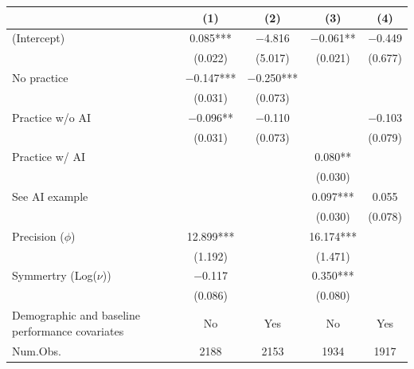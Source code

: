 \documentclass[11pt]{report}
\begin{document}
\begin{append}
\begin{table}[ht]
    \begin{tabular}{lcccc}
    \toprule
& (1) & (2) & (3) & (4) \\ \midrule 
(Intercept)                                                                      & \num{0.085}***  & \num{-4.816}    & \num{-0.061}**  & \num{-0.449}   \\
& (\num{0.022})   & (\num{5.017})   & (\num{0.021})   & (\num{0.677})  \\
No practice                                                             & \num{-0.147}*** & \num{-0.250}*** &                  &                 \\
& (\num{0.031})   & (\num{0.073})   &                  &                 \\
Practice w/o AI                                                          & \num{-0.096}**  & \num{-0.110}    &                  & \num{-0.103}   \\
& (\num{0.031})   & (\num{0.073})   &                  & (\num{0.079})  \\
Practice w/ AI                                                           &                  &                  & \num{0.080}**   &                 \\
&                  &                  & (\num{0.030})   &                 \\
See AI example                                                          &                  &                  & \num{0.097}***  & \num{0.055}    \\
&                  &                  & (\num{0.030})   & (\num{0.078})  \\\midrule 
Precision ($\phi$)                                                                            & \num{12.899}*** &                  & \num{16.174}*** &                 \\
& (\num{1.192})   &                  & (\num{1.471})   &                 \\
Symmertry (Log($\nu$))                                                                          & \num{-0.117}    &                  & \num{0.350}***  &                 \\
& (\num{0.086})   &                  & (\num{0.080})   &                 \\
Demographic and baseline performance covariates & No & Yes & No & Yes\\
\midrule 
Num.Obs.                                                                         & \num{2188}      & \num{2153}      & \num{1934}      & \num{1917}     \\

\end{tabular}
\end{table}
\end{append}
\end{document}
